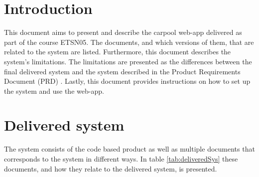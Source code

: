 \documentclass{article}
\begin{document}
\tableofcontents
\newpage


\section{Introduction}\label{sec:intro} %
This document aims to present and describe the carpool web-app delivered as part of the course ETSN05. The documents, and which versions of them, that are related to the system are listed. Furthermore, this document describes the system's limitations. The limitations are presented as the differences between the final delivered system and the system described in the Product Requirements Document (PRD) \cite{PRD}. Lastly, this document provides instructions on how to set up the system and use the web-app.

\section{Delivered system} %


The system consists of the code based product as well as multiple documents that corresponds to the system in different ways. In table \ref{tab:deliveredSys} these documents, and how they relate to the delivered system, is presented. 
\end{document}
